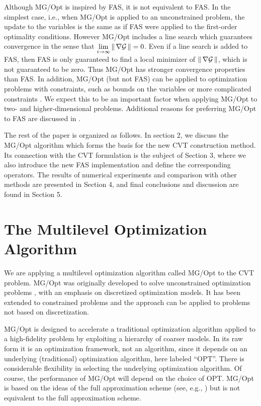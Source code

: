 \documentclass{siamltex}
\newcommand{\ds}{\displaystyle}
\begin{document}
Although MG/Opt is inspired by FAS, it is not equivalent to FAS.  In the simplest case, i.e., when MG/Opt is applied to an unconstrained problem, the update to the variables is the same as if FAS were applied to the first-order optimality conditions.  However MG/Opt includes a line search which guarantees convergence in the sense that $\ds \lim_{i\rightarrow \infty} \norm{\nabla \cg} = 0$. Even if a line search %
is added to FAS, then FAS is only guaranteed to find a local minimizer of $\norm{\nabla \cg}$, which is not guaranteed to be zero.  Thus MG/Opt has stronger convergence properties than FAS.  In addition, MG/Opt (but not FAS) can be applied to optimization problems with constraints, such as bounds on the variables or more complicated constraints \cite{Nash10a}.  We expect this to be an important factor when applying MG/Opt to two- and higher-dimensional problems.  Additional reasons for preferring MG/Opt to FAS are discussed in \cite{LeNa05a}.

The rest of the paper is organized as follows. In section 2, we discuss the MG/Opt algorithm which forms the basis for the new CVT construction method. Its connection with the CVT formulation is the subject of Section 3, where we also introduce the new FAS implementation and define the corresponding operators. The results of numerical experiments and comparison with other methods are presented in Section 4, and final conclusions and discussion are found in Section 5.

\section{The Multilevel Optimization Algorithm}

We are applying a multilevel optimization algorithm called MG/Opt to the CVT problem. MG/Opt was originally developed to solve unconstrained optimization problems \cite{Nash00a}, with an emphasis on discretized optimization models.  It has been extended to constrained problems \cite{Nash10a} and the approach can be applied to problems not based on discretization.

MG/Opt is designed to accelerate a traditional optimization algorithm applied to a high-fidelity problem by exploiting a hierarchy of coarser models.  In its raw form it is an optimization framework, not an algorithm, since it depends on an underlying (traditional) optimization algorithm, here labeled ``OPT''. There is considerable flexibility in selecting the underlying optimization algorithm.  Of course, the performance of MG/Opt will depend on the choice of OPT.  MG/Opt is based on the ideas of the full approximation scheme (see, e.g., \cite{McCo92a}) but is not equivalent to the full approximation scheme.
\end{document}
